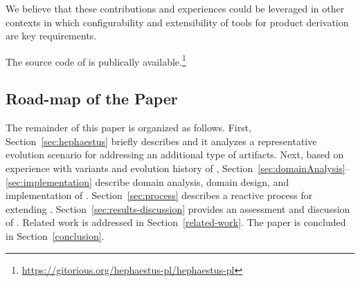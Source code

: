 We believe that these contributions and experiences could be leveraged in other contexts in which configurability and extensibility of tools for product derivation are key requirements. 

The source code of \hpl{} is publically available.\footnote{\url{https://gitorious.org/hephaestus-pl/hephaestus-pl}}


\subsection*{Road-map of the Paper}

The remainder of this paper is organized as follows. First, Section~\ref{sec:hephaestus} briefly describes \hp{} and it analyzes a representative evolution scenario for addressing an additional type of artifacts. Next, based on experience with variants and evolution history of \hp, Section~\ref{sec:domainAnalysis}--\ref{sec:implementation} describe 
domain analysis, domain design, and implementation of \hpl. Section~\ref{sec:process} describes a reactive process for extending \hpl. Section~\ref{sec:results-discussion} provides an assessment and discussion of \hpl. Related work is addressed in Section~\ref{related-work}. The paper is concluded in Section~\ref{conclusion}.

